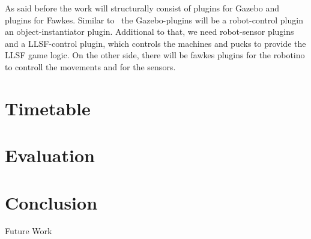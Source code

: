 \documentclass[11pt,a4paper,titlepage]{article}
\begin{document}
As said before the work will structurally consist of plugins for Gazebo and plugins for Fawkes. Similar to~\cite{KlingenDA} the Gazebo-plugins will be a robot-control plugin an object-instantiator plugin. Additional to that, we need robot-sensor plugins and a LLSF-control plugin, which controls the machines and pucks to provide the LLSF game logic. On the other side, there will be fawkes plugins for the robotino to controll the movements and for the sensors.

\section{Timetable}
\section{Evaluation}
\section{Conclusion}
Future Work



\end{document}

